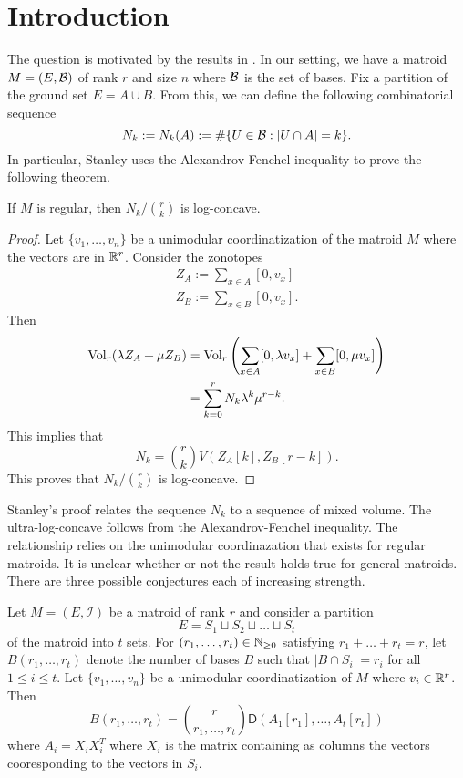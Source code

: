 \documentclass[12pt]{article}
\begin{document}
\section{Introduction}

The question is motivated by the results in \cite{STANLEY}. In our setting, we have a matroid $M = (E, \mathcal{B})$ of rank $r$ and size $n$ where $\mathcal{B}$ is the set of bases. Fix a partition of the ground set $E = A \cup B$. From this, we can define the following combinatorial sequence
\[
	N_k := N_k(A) := \# \{U \in \mathcal{B} : |U \cap A| = k\}.
\]
In particular, Stanley uses the Alexandrov-Fenchel inequality to prove the following theorem. 
\begin{thm} \label{stanley-theorem}
	If $M$ is regular, then $N_k / \binom{r}{k}$ is log-concave. 
\end{thm}

\begin{proof}
	Let $\{v_1, \ldots, v_n\}$ be a unimodular coordinatization of the matroid $M$ where the vectors are in $\mathbb{R}^r$. Consider the zonotopes
	\begin{align*}
		Z_A := \sum_{x \in A} [0, v_x] \\
		Z_B := \sum_{x \in B} [0, v_x].
	\end{align*}
	Then 
	\begin{align*}
		\operatorname{Vol}_r (\lambda Z_A + \mu Z_B) & = \operatorname{Vol}_r \left ( \sum_{x \in A} [0, \lambda v_x] + \sum_{x \in B} [0, \mu v_x] \right ) \\
		& = \sum_{k = 0}^r N_k \lambda^k \mu^{r-k}.
	\end{align*}
	This implies that 
	\[
		N_k = \binom{r}{k} V(Z_A[k], Z_B[r-k]). 
	\]
	This proves that $N_k / \binom{r}{k}$ is log-concave. 
\end{proof}

Stanley's proof relates the sequence $N_k$ to a sequence of mixed volume. The ultra-log-concave follows from the Alexandrov-Fenchel inequality. The relationship relies on the unimodular coordinazation that exists for regular matroids. It is unclear whether or not the result holds true for general matroids. There are three possible conjectures each of increasing strength. 

\begin{thm}
	Let $M = (E, \mathcal{I})$ be a matroid of rank $r$ and consider a partition 
	\[
		E = S_1 \sqcup S_2 \sqcup \ldots \sqcup S_t
	\]
	of the matroid into $t$ sets. For $(r_1, \ldots, r_t) \in \mathbb{N}_{\geq 0}$ satisfying $r_1 + \ldots + r_t = r$, let $B(r_1, \ldots, r_t)$ denote the number of bases $B$ such that $|B \cap S_i| = r_i$ for all $1 \leq i \leq t$. Let $\{v_1, \ldots, v_n\}$ be a unimodular coordinatization of $M$ where $v_i \in \mathbb{R}^r$. Then 
	\[
		B(r_1, \ldots, r_t) = \binom{r}{r_1, \ldots, r_t} \mathsf{D} (A_1 [r_1], \ldots, A_t [r_t])
	\]
	where $A_i = X_i X_i^T$ where $X_i$ is the matrix containing as columns the vectors cooresponding to the vectors in $S_i$. 
\end{thm}
\end{document}
